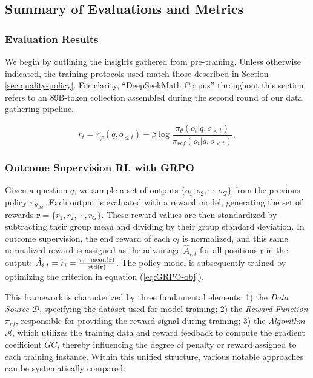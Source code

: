 \begin{itemize}[topsep=0pt]
\subsection{Summary of Evaluations and Metrics}

\subsubsection{Evaluation Results}

We begin by outlining the insights gathered from pre-training. Unless otherwise indicated, the training protocols used match those described in Section \ref{sec:quality-policy}. For clarity, “DeepSeekMath Corpus” throughout this section refers to an 89B-token collection assembled during the second round of our data gathering pipeline.

\begin{equation}
    r_{t} = r_\varphi(q, o_{\le t}) - \beta \log\frac{\pi_{\theta}(o_{t}|q, o_{<t})}{\pi_{ref}(o_{t}|q, o_{<t})},
\label{eq:PPO-reward}
\end{equation}

\subsubsection{Outcome Supervision RL with GRPO} Given a question $q$, we sample a set of outputs $\{o_1, o_2, \cdots, o_G\}$ from the previous policy $\pi_{\theta_{old}}$. Each output is evaluated with a reward model, generating the set of rewards $\mathbf{r}=\{r_1, r_2, \cdots, r_G\}$. These reward values are then standardized by subtracting their group mean and dividing by their group standard deviation. In outcome supervision, the end reward of each $o_i$ is normalized, and this same normalized reward is assigned as the advantage $\hat{A}_{i, t}$ for all positions $t$ in the output: $\hat{A}_{i, t} = \widetilde{r}_i = \frac{r_i- {\rm mean}(\mathbf{r})}{{\rm std}(\mathbf{r})}$. The policy model is subsequently trained by optimizing the criterion in equation (\ref{eq:GRPO-obj}).

This framework is characterized by three fundamental elements: 1) the \textit{Data Source $\mathcal{D}$}, specifying the dataset used for model training; 2) the \textit{Reward Function $\pi_{{rf}}$}, responsible for providing the reward signal during training; 3) the \textit{Algorithm $\mathcal{A}$}, which utilizes the training data and reward feedback to compute the gradient coefficient $GC$, thereby influencing the degree of penalty or reward assigned to each training instance. Within this unified structure, various notable approaches can be systematically compared:


\end{itemize}
